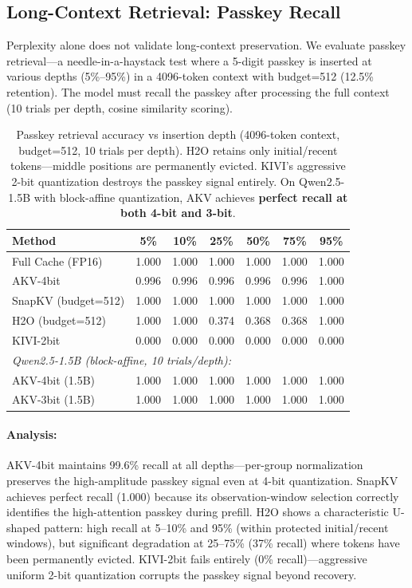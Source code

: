 \documentclass[11pt,a4paper]{article}
\begin{document}
\subsection{Long-Context Retrieval: Passkey Recall}

Perplexity alone does not validate long-context preservation. We evaluate passkey retrieval---a needle-in-a-haystack test where a 5-digit passkey is inserted at various depths (5\%--95\%) in a 4096-token context with budget=512 (12.5\% retention). The model must recall the passkey after processing the full context (10 trials per depth, cosine similarity scoring).

\begin{table}[h]
\centering
\begin{tabular}{lcccccc}
\toprule
\textbf{Method} & \textbf{5\%} & \textbf{10\%} & \textbf{25\%} & \textbf{50\%} & \textbf{75\%} & \textbf{95\%} \\
\midrule
Full Cache (FP16) & 1.000 & 1.000 & 1.000 & 1.000 & 1.000 & 1.000 \\
AKV-4bit & 0.996 & 0.996 & 0.996 & 0.996 & 0.996 & 1.000 \\
SnapKV (budget=512) & 1.000 & 1.000 & 1.000 & 1.000 & 1.000 & 1.000 \\
H2O (budget=512) & 1.000 & 1.000 & 0.374 & 0.368 & 0.368 & 1.000 \\
KIVI-2bit & 0.000 & 0.000 & 0.000 & 0.000 & 0.000 & 0.000 \\
\midrule
\multicolumn{7}{l}{\textit{Qwen2.5-1.5B (block-affine, 10 trials/depth):}} \\
AKV-4bit (1.5B) & 1.000 & 1.000 & 1.000 & 1.000 & 1.000 & 1.000 \\
AKV-3bit (1.5B) & 1.000 & 1.000 & 1.000 & 1.000 & 1.000 & 1.000 \\
\bottomrule
\end{tabular}
\caption{Passkey retrieval accuracy vs insertion depth (4096-token context, budget=512, 10 trials per depth). H2O retains only initial/recent tokens---middle positions are permanently evicted. KIVI's aggressive 2-bit quantization destroys the passkey signal entirely. On Qwen2.5-1.5B with block-affine quantization, AKV achieves \textbf{perfect recall at both 4-bit and 3-bit}.}
\label{tab:passkey}
\end{table}

\paragraph{Analysis:} AKV-4bit maintains 99.6\% recall at all depths---per-group normalization preserves the high-amplitude passkey signal even at 4-bit quantization. SnapKV achieves perfect recall (1.000) because its observation-window selection correctly identifies the high-attention passkey during prefill. H2O shows a characteristic U-shaped pattern: high recall at 5--10\% and 95\% (within protected initial/recent windows), but significant degradation at 25--75\% (37\% recall) where tokens have been permanently evicted. KIVI-2bit fails entirely (0\% recall)---aggressive uniform 2-bit quantization corrupts the passkey signal beyond recovery.
\end{document}
